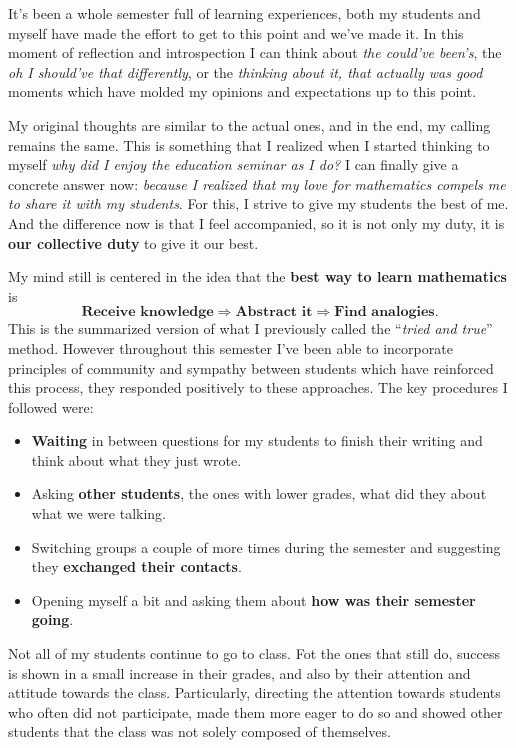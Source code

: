 \documentclass[a4paper,12pt,final]{book}
\begin{document}
It's been a whole semester full of learning experiences, both my students and myself have made the effort to get to this point and we've made it. In this moment of reflection and introspection I can think about \emph{the could've been's}, the \emph{oh I should've that differently}, or the \emph{thinking about it, that actually was good} moments which have molded my opinions and expectations up to this point.\par 
My original thoughts are similar to the actual ones, and in the end, my calling remains the same. This is something that I realized when I started thinking to myself \emph{why did I enjoy the education seminar as I do?} I can finally give a concrete answer now: \emph{because I realized that my love for mathematics compels me to share it with my students}. For this, I strive to give my students the best of me. And the difference now is that I feel accompanied, so it is not only my duty, it is \textbf{our collective duty} to give it our best.  \par 
My mind still is centered in the idea that the \textbf{best way to learn mathematics }is 
$$\textbf{Receive knowledge}\Rightarrow\textbf{Abstract it}\Rightarrow\textbf{Find analogies}.$$
This is the summarized version of what I previously called the ``\emph{tried and true}'' method. However throughout this semester I've been able to incorporate principles of community and sympathy between students which have reinforced this process, they responded positively to these approaches. The key procedures I followed were:
\begin{itemize}
    \itemsep=-0.5em
    \item \textbf{Waiting} in between questions for my students to finish their writing and think about what they just wrote. 
    \item Asking \textbf{other students}, the ones with lower grades, what did they about what we were talking. 
    \item Switching groups a couple of more times during the semester and suggesting they \textbf{exchanged their contacts}. 
    \item Opening myself a bit and asking them about \textbf{how was their semester going}. 
\end{itemize}
Not all of my students continue to go to class. 
Fot the ones that still do, success is shown in a small increase in their grades, and also by their attention and attitude towards the class. 
Particularly, directing the attention towards students who often did not participate, made them more eager to do so and showed other students that the class was not solely composed of themselves. 
\end{document}
